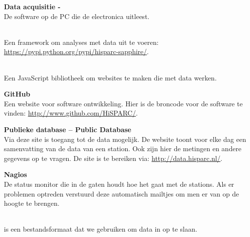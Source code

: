 \textbf{Data acquisitie - \hisparc\daq} \\
De software op de \hisparc PC die de \hisparc electronica uitleest.

\textbf{\sapphire} \\
Een \python framework om analyses met \hisparc data uit te voeren:
\url{https://pypi.python.org/pypi/hisparc-sapphire/}.

\textbf{\jsparc} \\
Een JavaScript bibliotheek om websites te maken die met \hisparc data
werken.

\textbf{GitHub} \\
Een website voor software ontwikkeling. Hier is de broncode voor de
\hisparc software te vinden: \url{http://www.github.com/HiSPARC/}.

\textbf{Publieke database -- Public Database} \\
Via deze site is toegang tot de \hisparc data mogelijk. De website toont
voor elke dag een samenvatting van de data van een station. Ook zijn
hier de metingen en andere gegevens op te vragen. De site is te bereiken
via: \url{http://data.hisparc.nl/}.

\textbf{Nagios} \\
De status monitor die in de gaten houdt hoe het gaat met de stations.
Als er problemen optreden verstuurd deze automatisch mailtjes om men er
van op de hoogte te brengen.

\textbf{\hdf} \\
\hdf is een bestandsformaat dat we gebruiken om data in op te slaan.


